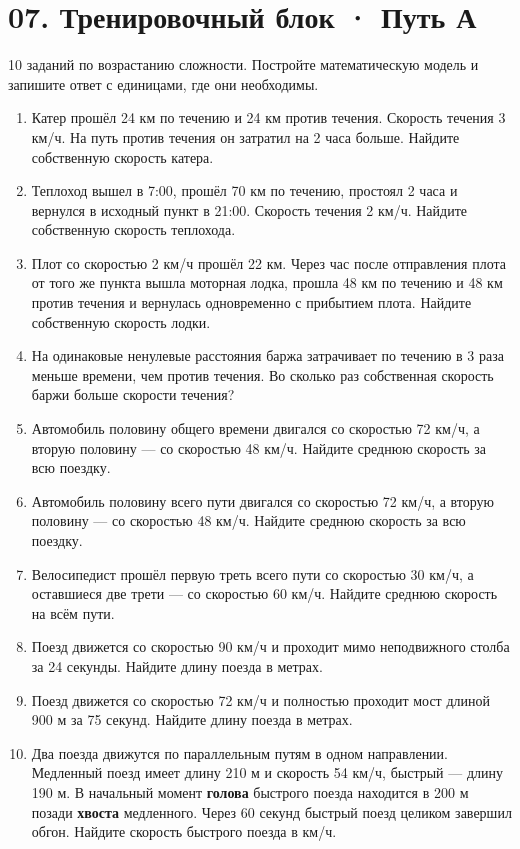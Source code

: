 \documentclass[a4paper,12pt]{article}
\newcommand{\ruleline}{\par\vspace{.15em}{\color{accent!65}\hrule height .6pt}\vspace{.65em}}
\begin{document}
\clearpage
\section*{07. Тренировочный блок · Путь А}
\ruleline
\textcolor{muted}{10 заданий по возрастанию сложности. Постройте математическую модель и запишите ответ с единицами, где они необходимы.}
\begin{enumerate}
\item Катер прошёл 24 км по течению и 24 км против течения. Скорость течения 3 км/ч. На путь против течения он затратил на 2 часа больше. Найдите собственную скорость катера.

\item Теплоход вышел в 7:00, прошёл 70 км по течению, простоял 2 часа и вернулся в исходный пункт в 21:00. Скорость течения 2 км/ч. Найдите собственную скорость теплохода.

\item Плот со скоростью 2 км/ч прошёл 22 км. Через час после отправления плота от того же пункта вышла моторная лодка, прошла 48 км по течению и 48 км против течения и вернулась одновременно с прибытием плота. Найдите собственную скорость лодки.

\item На одинаковые ненулевые расстояния баржа затрачивает по течению в 3 раза меньше времени, чем против течения. Во сколько раз собственная скорость баржи больше скорости течения?

\item Автомобиль половину общего времени двигался со скоростью 72 км/ч, а вторую половину --- со скоростью 48 км/ч. Найдите среднюю скорость за всю поездку.

\item Автомобиль половину всего пути двигался со скоростью 72 км/ч, а вторую половину --- со скоростью 48 км/ч. Найдите среднюю скорость за всю поездку.

\item Велосипедист прошёл первую треть всего пути со скоростью 30 км/ч, а оставшиеся две трети --- со скоростью 60 км/ч. Найдите среднюю скорость на всём пути.

\item Поезд движется со скоростью 90 км/ч и проходит мимо неподвижного столба за 24 секунды. Найдите длину поезда в метрах.

\item Поезд движется со скоростью 72 км/ч и полностью проходит мост длиной 900 м за 75 секунд. Найдите длину поезда в метрах.

\item Два поезда движутся по параллельным путям в одном направлении. Медленный поезд имеет длину 210 м и скорость 54 км/ч, быстрый --- длину 190 м. В начальный момент \textbf{голова} быстрого поезда находится в 200 м позади \textbf{хвоста} медленного. Через 60 секунд быстрый поезд целиком завершил обгон. Найдите скорость быстрого поезда в км/ч.
\end{enumerate}
\end{document}
